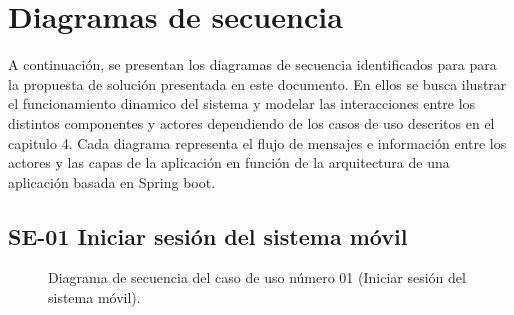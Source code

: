 \newpage







\section{Diagramas de secuencia}

A continuación, se presentan los diagramas de secuencia identificados para para la propuesta de solución presentada en este documento.
En ellos se busca ilustrar el funcionamiento dinamico del sistema y modelar las interacciones entre los distintos componentes y actores dependiendo de los casos de uso descritos en el capitulo 4. 
Cada diagrama representa el flujo de mensajes e información entre los actores y las capas de la aplicación en función de la arquitectura de una aplicación basada en Spring boot.

\subsection{SE-01 Iniciar sesión del sistema móvil}

\begin{figure}[htbp!]
	\begin{center}
		\caption{Diagrama de secuencia del caso de uso número 01 (Iniciar sesión del sistema móvil).}
		\label{fig:Diagrama de secuencia CU-01}
	\end{center}
\end{figure}

